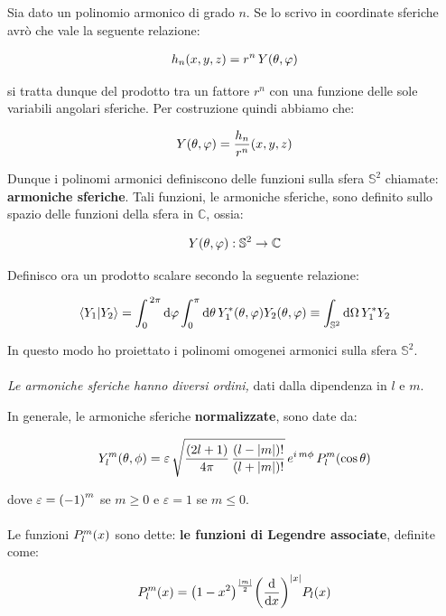 	Sia dato un polinomio armonico di grado $n$. Se lo scrivo in coordinate sferiche avrò che vale la seguente relazione:

\begin{align*}
	h_n\qty(x, y, z) = r^n \, Y\qty(\theta, \varphi)
\end{align*}

	si tratta dunque del prodotto tra un fattore $r^n$ con una funzione delle sole variabili angolari sferiche. Per costruzione quindi abbiamo che:
	
\begin{align*}
	Y\qty(\theta, \varphi) = \frac{h_n}{r^n} \qty(x, y, z)
\end{align*}

	Dunque i polinomi armonici definiscono delle funzioni sulla sfera $\mathbb{S}^2$ chiamate: \textbf{armoniche sferiche}. Tali funzioni, le armoniche sferiche, sono definito sullo spazio delle funzioni della sfera in $\mathbb{C}$, ossia:
	
\begin{align*}
	Y\qty(\theta, \varphi) : \mathbb{S}^2 \to \mathbb{C}
\end{align*}

	Definisco ora un prodotto scalare secondo la seguente relazione:

\begin{align*}
	\braket{Y_1}{Y_2} = \int_0^{\,2\pi} \dd \varphi \int_0^{\pi} \dd \theta \, Y_1^* \qty(\theta, \varphi) Y_2\qty(\theta, \varphi) \equiv \int_{\mathbb{S}^2} \dd \Omega \, Y_1^* Y_2
\end{align*}

	In questo modo ho proiettato i polinomi omogenei armonici sulla sfera $\mathbb{S}^2$. 
	\\
	\\
	\textit{Le armoniche sferiche hanno diversi ordini,} dati dalla dipendenza in $l$ e $m$. 

\begin{mydef}
	In generale, le armoniche sferiche \textbf{normalizzate}, sono date da:
	
 \begin{align*}
	Y_l^m \qty(\theta, \phi) =  \varepsilon \, \sqrt{\frac{\qty(2l +1 )}{4	\pi} \, \frac{\qty(l -|m|)!}{\qty(l + |m|)!}} \, e^{i \, m\phi} \, P_l^m\qty(\cos\theta)
\end{align*}

	dove $\varepsilon = \qty(-1)^m$ se $m \geq 0$ e $\varepsilon = 1$ se $m \leq 0$.
	\\
	\\
	Le funzioni $P_l^m\qty(x)$ sono dette: \textbf{le funzioni di Legendre associate}, definite come:
	
\begin{align*}
	P_l^m\qty(x) = \qty(1-x^2)^{\frac{|m|}{2}} \qty(\dv{}{x})^{|x|} P_l \qty(x)
\end{align*}
\end{mydef}

